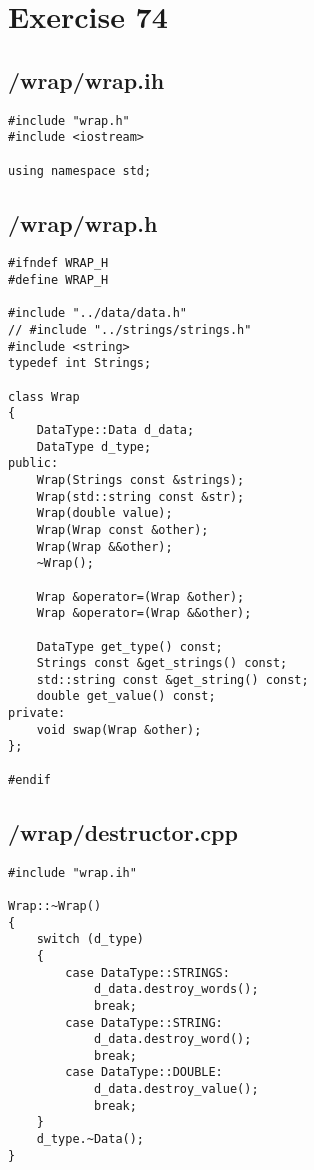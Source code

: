 \documentclass{article}
\begin{document}
\section*{Exercise 74}
\subsection*{/wrap/wrap.ih}
\begin{verbatim}
#include "wrap.h"
#include <iostream>

using namespace std;

\end{verbatim}
\subsection*{/wrap/wrap.h}
\begin{verbatim}
#ifndef WRAP_H
#define WRAP_H

#include "../data/data.h"
// #include "../strings/strings.h"
#include <string>
typedef int Strings;

class Wrap
{
    DataType::Data d_data;
    DataType d_type;
public:
    Wrap(Strings const &strings);
    Wrap(std::string const &str);
    Wrap(double value);
    Wrap(Wrap const &other);
    Wrap(Wrap &&other);
    ~Wrap();

    Wrap &operator=(Wrap &other);
    Wrap &operator=(Wrap &&other);

    DataType get_type() const;
    Strings const &get_strings() const;
    std::string const &get_string() const;
    double get_value() const;
private:
    void swap(Wrap &other);
};

#endif

\end{verbatim}
\subsection*{/wrap/destructor.cpp}
\begin{verbatim}
#include "wrap.ih"

Wrap::~Wrap()
{
    switch (d_type)
    {
        case DataType::STRINGS:
            d_data.destroy_words();
            break;
        case DataType::STRING:
            d_data.destroy_word();
            break;
        case DataType::DOUBLE:
            d_data.destroy_value();
            break;
    }
    d_type.~Data();
}
\end{verbatim}
\end{document}

